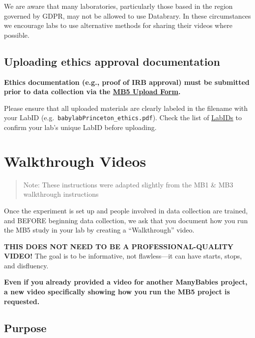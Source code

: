 \documentclass[
  letterpaper,
  DIV=11,
  numbers=noendperiod,
  oneside]{scrreprt}
\begin{document}
We are aware that many laboratories, particularly those based in the
region governed by GDPR, may not be allowed to use Databrary. In these
circumstances we encourage labs to use alternative methods for sharing
their videos where possible.

\section{Uploading ethics approval documentation}\label{ethics-upload}

\textbf{Ethics documentation (e.g., proof of IRB approval) must be
submitted prior to data collection via the
\href{https://airtable.com/appRoqMKzcK3NsXt4/pagPm3MXnFExsz1Ti/form}{MB5
Upload Form}.}

Please ensure that all uploaded materials are clearly labeled in the
filename with your LabID (e.g.~\texttt{babylabPrinceton\_ethics.pdf}).
Check the list of \href{https://manybabies.org/labids/}{LabIDs} to
confirm your lab's unique LabID before uploading.

\chapter{Walkthrough Videos}\label{sec-walkthrough}

\begin{quote}
Note: These instructions were adapted slightly from the MB1 \& MB3
walkthrough instructions
\end{quote}

Once the experiment is set up and people involved in data collection are
trained, and BEFORE beginning data collection, we ask that you document
how you run the MB5 study in your lab by creating a ``Walkthrough''
video.

\textbf{THIS DOES NOT NEED TO BE A PROFESSIONAL-QUALITY VIDEO!} The goal
is to be informative, not flawless---it can have starts, stops, and
disfluency.

\textbf{Even if you already provided a video for another ManyBabies
project, a new video specifically showing how you run the MB5 project is
requested.}

\section{Purpose}\label{purpose}
\end{document}
